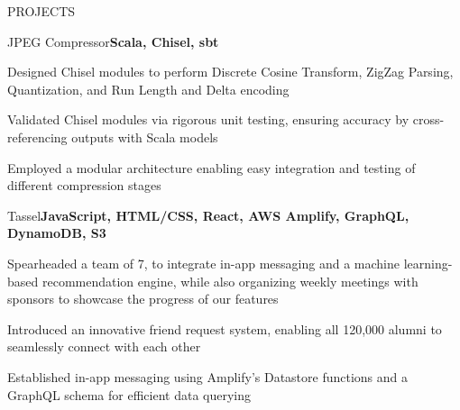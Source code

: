 \documentclass[]{resume}
\begin{document}
\begin{section}{PROJECTS}
\begin{subsection}{JPEG Compressor}{}{\textbf{Scala, Chisel, sbt}}{}
    \item Designed Chisel modules to perform Discrete Cosine Transform, ZigZag Parsing, Quantization, and Run Length and Delta encoding
    \item Validated Chisel modules via rigorous unit testing, ensuring accuracy by cross-referencing outputs with Scala models
    \item Employed a modular architecture enabling easy integration and testing of different compression stages
\end{subsection}
\begin{subsection}{Tassel}{}{\textbf{JavaScript, HTML/CSS, React, AWS Amplify, GraphQL, DynamoDB, S3}}{}
    \item Spearheaded a team of 7, to integrate in-app messaging and a machine learning-based recommendation engine, while also organizing weekly meetings with sponsors to showcase the progress of our features
    \item Introduced an innovative friend request system, enabling all 120,000 alumni to seamlessly connect with each other
    \item Established in-app messaging using Amplify's Datastore functions and a GraphQL schema for efficient data querying
\end{subsection}
\end{section}

\end{document}
